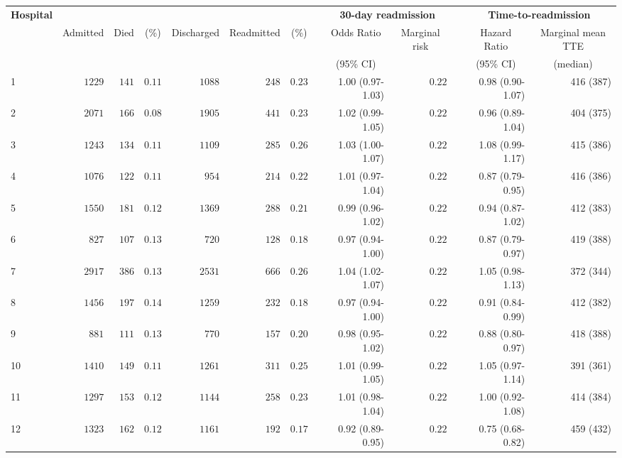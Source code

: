\documentclass[]{article}\usepackage[]{graphicx}\usepackage[]{color}
\begin{document}
\begin{landscape}
\begin{table}[!tbp]
\end{table}
\begin{table}[!tbp]
\begin{center}
\begin{tabular}{lrrrrrrcrrcrr}
\hline\hline
\multicolumn{1}{l}{\bfseries Hospital}&\multicolumn{6}{c}{\bfseries }&\multicolumn{1}{c}{\bfseries }&\multicolumn{2}{c}{\bfseries 30-day readmission}&\multicolumn{1}{c}{\bfseries }&\multicolumn{2}{c}{\bfseries Time-to-readmission}\tabularnewline
\cline{9-10} \cline{12-13}
\multicolumn{1}{l}{}&\multicolumn{1}{c}{Admitted}&\multicolumn{1}{c}{Died}&\multicolumn{1}{c}{(\%)}&\multicolumn{1}{c}{Discharged}&\multicolumn{1}{c}{Readmitted}&\multicolumn{1}{c}{(\%)}&\multicolumn{1}{c}{}&\multicolumn{1}{c}{Odds Ratio}&\multicolumn{1}{c}{Marginal risk}&\multicolumn{1}{c}{}&\multicolumn{1}{c}{Hazard Ratio}&\multicolumn{1}{c}{Marginal mean TTE}\tabularnewline
&&&&&&&&\multicolumn{1}{c}{{\scriptsize (95\% CI)}}&&&\multicolumn{1}{c}{{\scriptsize (95\% CI)}}&\multicolumn{1}{c}{{\scriptsize (median)}}\tabularnewline
\hline
1&$1229$&$141$&$0.11$&$1088$&$248$&$0.23$&&1.00 (0.97-1.03)&$0.22$&&0.98 (0.90-1.07)&416 (387)\tabularnewline
2&$2071$&$166$&$0.08$&$1905$&$441$&$0.23$&&1.02 (0.99-1.05)&$0.22$&&0.96 (0.89-1.04)&404 (375)\tabularnewline
3&$1243$&$134$&$0.11$&$1109$&$285$&$0.26$&&1.03 (1.00-1.07)&$0.22$&&1.08 (0.99-1.17)&415 (386)\tabularnewline
4&$1076$&$122$&$0.11$&$ 954$&$214$&$0.22$&&1.01 (0.97-1.04)&$0.22$&&0.87 (0.79-0.95)&416 (386)\tabularnewline
5&$1550$&$181$&$0.12$&$1369$&$288$&$0.21$&&0.99 (0.96-1.02)&$0.22$&&0.94 (0.87-1.02)&412 (383)\tabularnewline
6&$ 827$&$107$&$0.13$&$ 720$&$128$&$0.18$&&0.97 (0.94-1.00)&$0.22$&&0.87 (0.79-0.97)&419 (388)\tabularnewline
7&$2917$&$386$&$0.13$&$2531$&$666$&$0.26$&&1.04 (1.02-1.07)&$0.22$&&1.05 (0.98-1.13)&372 (344)\tabularnewline
8&$1456$&$197$&$0.14$&$1259$&$232$&$0.18$&&0.97 (0.94-1.00)&$0.22$&&0.91 (0.84-0.99)&412 (382)\tabularnewline
9&$ 881$&$111$&$0.13$&$ 770$&$157$&$0.20$&&0.98 (0.95-1.02)&$0.22$&&0.88 (0.80-0.97)&418 (388)\tabularnewline
10&$1410$&$149$&$0.11$&$1261$&$311$&$0.25$&&1.01 (0.99-1.05)&$0.22$&&1.05 (0.97-1.14)&391 (361)\tabularnewline
11&$1297$&$153$&$0.12$&$1144$&$258$&$0.23$&&1.01 (0.98-1.04)&$0.22$&&1.00 (0.92-1.08)&414 (384)\tabularnewline
12&$1323$&$162$&$0.12$&$1161$&$192$&$0.17$&&0.92 (0.89-0.95)&$0.22$&&0.75 (0.68-0.82)&459 (432)\tabularnewline

\end{tabular}
\end{center}
\end{table}
\end{landscape}
\end{document}
